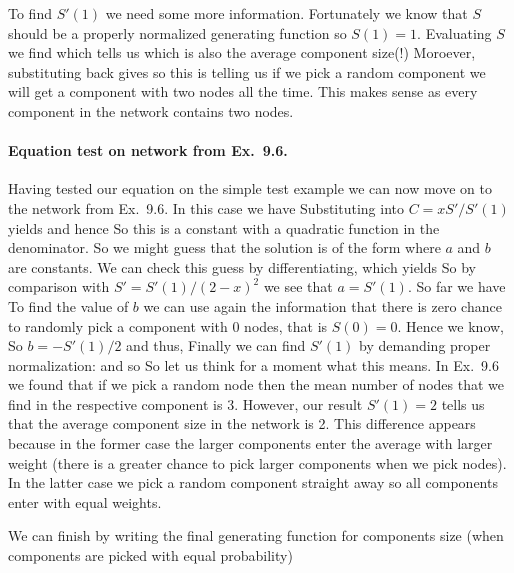 To find $S'(1)$ we need some more information. Fortunately we know that  
$S$ should be a properly normalized generating function so $S(1)=1$. Evaluating $S$ we find
which tells us
which is also the average component size(!) Moroever, substituting back gives  
so this is telling us if we pick a random component we will get a component with two nodes all the time. This makes sense as every component in the network contains two nodes. 

\paragraph{Equation test on network from Ex.~9.6.}Having tested our equation on the simple test example we can now move on to the network from Ex.~9.6. In this case we have 
Substituting into $C=xS'/S'(1)$ yields
and hence 
So this is a constant with a quadratic function in the denominator. So we might guess that the solution is of the form 
where $a$ and $b$ are constants. We can check this guess by differentiating, which yields
So by comparison with $S'=S'(1)/(2-x)^2$ we see that $a=S'(1)$. So far we have 
To find the value of $b$ we can use again the information that there is zero chance to randomly pick a component with 0 nodes, that is $S(0)=0$. 
Hence we know,
So $b=-S'(1)/2$ and thus,
Finally we can find $S'(1)$ by demanding proper normalization:
and so 
So let us think for a moment what this means. In Ex.~9.6 we found that if we pick a random node then the mean number of nodes that we find in the respective component is 3. However, our result $S'(1)=2$ tells us that the average component size in the network is 2. This difference appears because in the former case the larger components enter the average with larger weight (there is a greater chance to pick larger components when we pick nodes). In the latter case we pick a random component straight away so all components enter with equal weights.  

We can finish by writing the final generating function for components size (when components are picked with equal probability)
